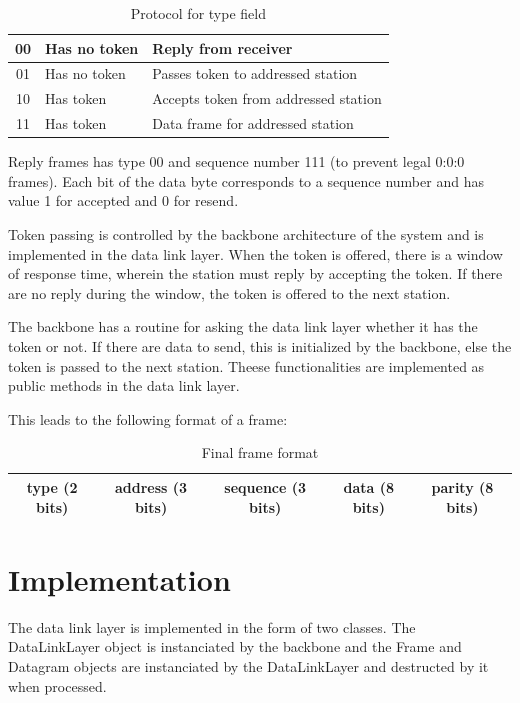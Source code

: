 \documentclass[letterpaper]{article}
\begin{document}
\begin{table}[htb]
	\begin{center}
	\begin{tabular}{|c|ll|}
		\hline
		00 & Has no token & Reply from receiver \\
		\hline
		01 & Has no token & Passes token to addressed station \\
		\hline
		10 & Has token & Accepts token from addressed station \\
		\hline
		11 & Has token & Data frame for addressed station \\
		\hline
	\end{tabular}
	\end{center}
	\caption{Protocol for type field}
	\label{tab:Protocol for type field}
\end{table}


Reply frames has type 00 and sequence number 111 (to prevent legal 0:0:0
frames). Each bit of the data byte corresponds to a sequence number and has
value 1 for accepted and 0 for resend.

Token passing is controlled by the backbone architecture of the system and is
implemented in the data link layer. When the token is offered,
there is a window of response time, wherein the station must reply by accepting
the token. If there are no reply during the window, the token is offered to the
next station. 

The backbone has a routine for asking the data link layer whether
it has the token or not. If there are data to send, this is initialized by the
backbone, else the token is passed to the next station. Theese functionalities
are implemented as public methods in the data link layer.

This leads to the following format of a frame: 

\begin{table}[htb]
	\begin{center}
	\begin{tabular}{|ccc|c|c|}
		\hline
		type (2 bits) & address (3 bits) & sequence (3 bits) & data (8 bits) & parity
		(8 bits)  \\
		\hline
	\end{tabular}
	\end{center}
	\caption{Final frame format}
	\label{tab:Final frame format}
\end{table}

\section{Implementation}
The data link layer is implemented in the form of two classes. The DataLinkLayer
object is instanciated by the backbone and the Frame and Datagram objects are
instanciated by the DataLinkLayer and destructed by it when processed.
\end{document}
